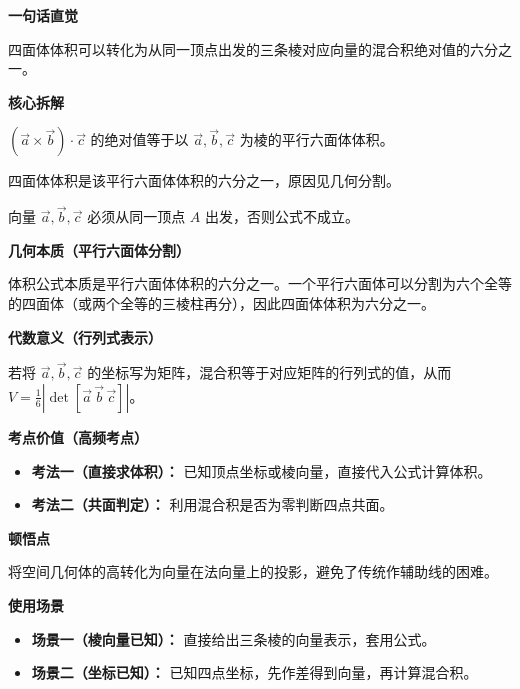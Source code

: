 \begin{explanationbox}

	\textbf{\textcolor{CExplanation}{一句话直觉}}

	四面体体积可以转化为从同一顶点出发的三条棱对应向量的混合积绝对值的六分之一。

	\medskip
	\textbf{\textcolor{CExplanation}{核心拆解}}
	\begin{description}[style=nextline, leftmargin=2.8em, labelsep=0.5em, itemsep=0.45em]
		\item[\textbf{要点一（向量混合积）：}] $(\vec{a}\times\vec{b})\cdot\vec{c}$ 的绝对值等于以 $\vec{a},\vec{b},\vec{c}$ 为棱的平行六面体体积。
		\item[\textbf{要点二（系数六分之一）：}] 四面体体积是该平行六面体体积的六分之一，原因见几何分割。
		\item[\textbf{要点三（起点统一）：}] 向量 $\vec{a},\vec{b},\vec{c}$ 必须从同一顶点 $A$ 出发，否则公式不成立。
	\end{description}

	\medskip
	\textbf{\textcolor{CExplanation}{几何本质（平行六面体分割）}}

	体积公式本质是平行六面体体积的六分之一。一个平行六面体可以分割为六个全等的四面体（或两个全等的三棱柱再分），因此四面体体积为六分之一。

	\medskip
	\textbf{\textcolor{CExplanation}{代数意义（行列式表示）}}

	若将 $\vec{a},\vec{b},\vec{c}$ 的坐标写为矩阵，混合积等于对应矩阵的行列式的值，从而 $V=\frac16|\det[\vec{a}\,\vec{b}\,\vec{c}]|$。

	\medskip
	\textbf{\textcolor{CExplanation}{考点价值（高频考点）}}
	\begin{itemize}[leftmargin=*, itemsep=0.5em, topsep=0.4em]
		\item \textbf{考法一（直接求体积）：} 已知顶点坐标或棱向量，直接代入公式计算体积。
		\item \textbf{考法二（共面判定）：} 利用混合积是否为零判断四点共面。
	\end{itemize}

	\medskip
	\textbf{\textcolor{CExplanation}{顿悟点}}

	将空间几何体的高转化为向量在法向量上的投影，避免了传统作辅助线的困难。

	\medskip
	\textbf{\textcolor{CExplanation}{使用场景}}
	\begin{itemize}[leftmargin=*, itemsep=0.5em, topsep=0.4em]
		\item \textbf{场景一（棱向量已知）：} 直接给出三条棱的向量表示，套用公式。
		\item \textbf{场景二（坐标已知）：} 已知四点坐标，先作差得到向量，再计算混合积。
	\end{itemize}
\end{explanationbox}
